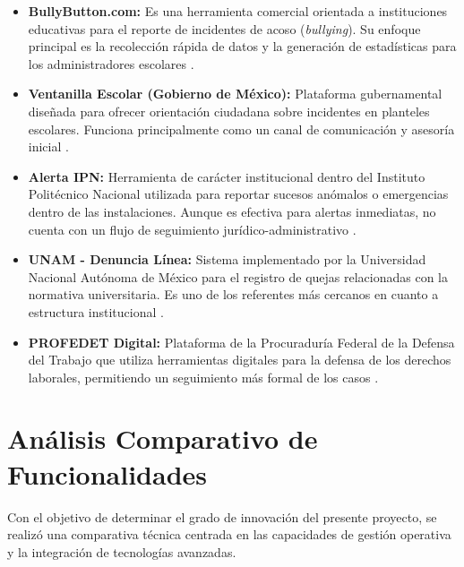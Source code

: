 \begin{itemize}
    \item \textbf{BullyButton.com:} Es una herramienta comercial orientada a instituciones educativas para el reporte de incidentes de acoso (\textit{bullying}). Su enfoque principal es la recolección rápida de datos y la generación de estadísticas para los administradores escolares \cite{7}.
    \item \textbf{Ventanilla Escolar (Gobierno de México):} Plataforma gubernamental diseñada para ofrecer orientación ciudadana sobre incidentes en planteles escolares. Funciona principalmente como un canal de comunicación y asesoría inicial \cite{8}.
    \item \textbf{Alerta IPN:} Herramienta de carácter institucional dentro del Instituto Politécnico Nacional utilizada para reportar sucesos anómalos o emergencias dentro de las instalaciones. Aunque es efectiva para alertas inmediatas, no cuenta con un flujo de seguimiento jurídico-administrativo \cite{9}.
    \item \textbf{UNAM - Denuncia Línea:} Sistema implementado por la Universidad Nacional Autónoma de México para el registro de quejas relacionadas con la normativa universitaria. Es uno de los referentes más cercanos en cuanto a estructura institucional \cite{10}.
    \item \textbf{PROFEDET Digital:} Plataforma de la Procuraduría Federal de la Defensa del Trabajo que utiliza herramientas digitales para la defensa de los derechos laborales, permitiendo un seguimiento más formal de los casos \cite{11}.
\end{itemize}

\section{Análisis Comparativo de Funcionalidades}
Con el objetivo de determinar el grado de innovación del presente proyecto, se realizó una comparativa técnica centrada en las capacidades de gestión operativa y la integración de tecnologías avanzadas.

